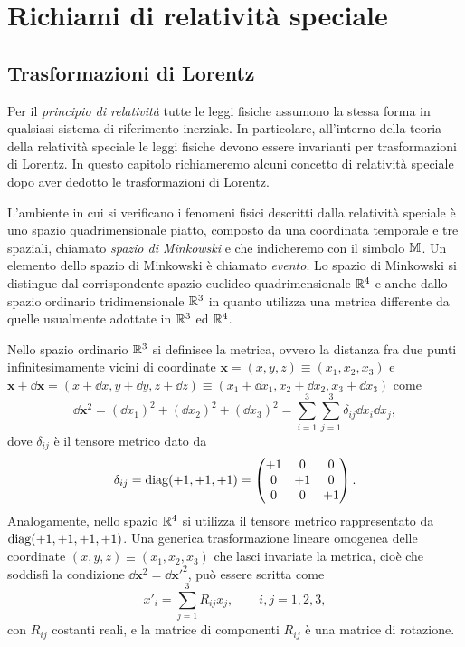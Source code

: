 \chapter{Richiami di relatività speciale}
\label{cha:relativita-speciale}

\section{Trasformazioni di Lorentz}
\label{sec:trasformazioni-lorentz}

Per il \emph{principio di relatività} tutte le
leggi fisiche assumono la stessa forma in qualsiasi sistema di riferimento
inerziale.  In particolare, all'interno della teoria della relatività speciale
le leggi fisiche devono essere invarianti per trasformazioni di Lorentz.  In
questo capitolo richiameremo alcuni concetto di relatività speciale dopo aver
dedotto le trasformazioni di Lorentz.

L'ambiente in cui si verificano i fenomeni fisici descritti dalla relatività
speciale è uno spazio quadrimensionale piatto, composto da una coordinata
temporale e tre spaziali, chiamato \emph{spazio
  di Minkowski}
e che indicheremo con il simbolo $\mathbb{M}$.  Un elemento dello spazio di
Minkowski è chiamato \emph{evento}.  Lo spazio di Minkowski si
distingue dal corrispondente spazio euclideo quadrimensionale $\mathbb{R}^{4}$ e anche
dallo spazio ordinario tridimensionale $\mathbb{R}^{3}$ in quanto utilizza una metrica
differente da quelle usualmente adottate in $\mathbb{R}^{3}$ ed $\mathbb{R}^{4}$.

Nello spazio ordinario $\mathbb{R}^{3}$ si definisce la metrica, ovvero la distanza fra
due punti infinitesimamente vicini di coordinate
$\bm{x} = (x,y,z) \equiv (x_{1},x_{2},x_{3})$ e
$\bm{x} + \dd \bm{x} = (x+\dd x,y+\dd y,z+\dd z) \equiv (x_{1}+\dd
x_{1},x_{2}+\dd x_{2},x_{3}+\dd x_{3})$ come
\begin{equation}
  \dd\bm{x}^{2} = (\dd x_{1})^{2} + (\dd x_{2})^{2} + (\dd x_{3})^{2} =
  \sum_{i=1}^{3} \sum_{j=1}^{3} \delta_{ij} \dd x_{i} \dd x_{j},
\end{equation}
dove $\delta_{ij}$ è il tensore metrico dato da
\begin{equation}
  \delta_{ij} = \operatorname{diag} (+1,+1,+1) =
  \begin{pmatrix}
    +1 & 0  & 0  \\
    0  & +1 & 0  \\
    0  & 0  & +1
  \end{pmatrix}.
\end{equation}
Analogamente, nello spazio $\mathbb{R}^{4}$ si utilizza il tensore metrico rappresentato
da $\operatorname{diag} (+1,+1,+1,+1)$.  Una generica trasformazione lineare omogenea delle
coordinate $(x,y,z) \equiv (x_{1},x_{2},x_{3})$ che lasci invariate la metrica,
cioè che soddisfi la condizione $\dd\bm{x}^{2} = \dd\bm{x}'^{2}$, può essere
scritta
come
\begin{equation}
  x'_{i} = \sum_{j=1}^{3} R_{ij}x_{j}, \qquad i,j = 1,2,3,
\end{equation}
con $R_{ij}$ costanti reali, e la matrice di componenti $R_{ij}$ è una matrice
di rotazione.

